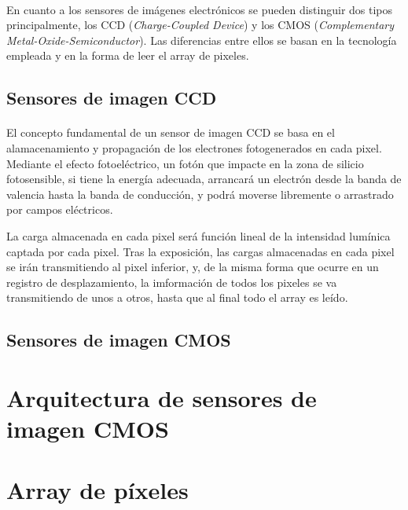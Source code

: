 \paragraph{}
En cuanto a los sensores de imágenes electrónicos se pueden distinguir dos tipos
principalmente, los CCD (\textit{Charge-Coupled Device}) y los CMOS
(\textit{Complementary Metal-Oxide-Semiconductor}). Las diferencias entre ellos
se basan en la tecnología empleada y en la forma de leer el array de pixeles.

\subsection{Sensores de imagen CCD}

\paragraph{}
El concepto fundamental de un sensor de imagen CCD se basa en el alamacenamiento
y propagación de los electrones fotogenerados en cada pixel. Mediante el efecto
fotoeléctrico, un fotón que impacte en la zona de silicio fotosensible, si tiene
la energía adecuada, arrancará un electrón desde la banda de valencia hasta la
banda de conducción, y podrá moverse libremente o arrastrado por campos eléctricos.

La carga almacenada en cada pixel será función lineal de la intensidad lumínica
captada por cada pixel. Tras la exposición, las cargas almacenadas en cada pixel
se irán transmitiendo al pixel inferior, y, de la misma forma que ocurre en un
registro de desplazamiento, la imformación de todos los pixeles se va transmitiendo
de unos a otros, hasta que al final todo el array es leído.

\subsection{Sensores de imagen CMOS}

\paragraph{}


\section{Arquitectura de sensores de imagen CMOS}

\section{Array de píxeles}


